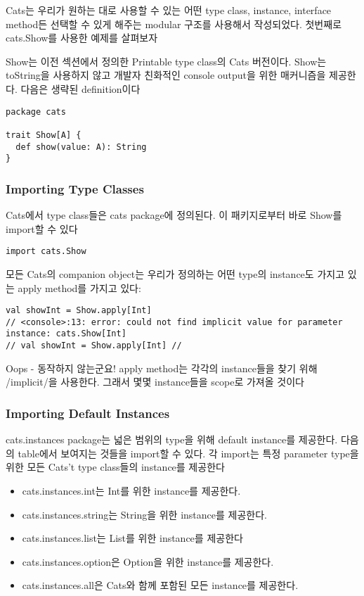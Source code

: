 \documentclass[a4paper]{article}
\begin{document}
Cats는 우리가 원하는 대로 사용할 수 있는 어떤 type class, instance, interface method든 선택할 수 있게 해주는 modular 구조를 사용해서 작성되었다. 첫번째로 cats.Show를 사용한 예제를 살펴보자

Show는 이전 섹션에서 정의한 Printable type class의 Cats 버전이다. Show는 toString을 사용하지 않고 개발자 친화적인 console output을 위한 매커니즘을 제공한다. 다음은 생략된 definition이다

\begin{verbatim}
package cats

trait Show[A] {
  def show(value: A): String
}
\end{verbatim}

\subsubsection{Importing Type Classes}
\label{sec:org22db5d8}
Cats에서 type class들은 cats package에 정의된다. 이 패키지로부터 바로 Show를 import할 수 있다

\begin{verbatim}
import cats.Show
\end{verbatim}

모든 Cats의 companion object는 우리가 정의하는 어떤 type의 instance도 가지고 있는 apply method를 가지고 있다:
\begin{verbatim}
val showInt = Show.apply[Int]
// <console>:13: error: could not find implicit value for parameter
instance: cats.Show[Int]
// val showInt = Show.apply[Int] //
\end{verbatim}

Oops - 동작하지 않는군요! apply method는 각각의 instance들을 찾기 위해 /implicit/을 사용한다. 그래서 몇몇 instance들을 scope로 가져올 것이다

\subsubsection{Importing Default Instances}
\label{sec:orgda79be5}
cats.instances package는 넓은 범위의 type을 위해 default instance를 제공한다. 다음의 table에서 보여지는 것들을 import할 수 있다. 각 import는 특정 parameter type을 위한 모든 Cats't type class들의 instance를 제공한다

\begin{itemize}
\item cats.instances.int는 Int를 위한 instance를 제공한다.
\item cats.instances.string는 String을 위한 instance를 제공한다.
\item cats.instances.list는 List를 위한 instance를 제공한다
\item cats.instances.option은 Option을 위한 instance를 제공한다.
\item cats.instances.all은 Cats와 함께 포함된 모든 instance를 제공한다.
\end{itemize}
\end{document}
